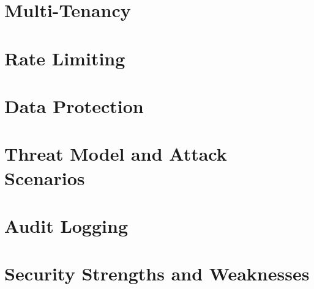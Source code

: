 \documentclass[a4paper,twoside]{sapthesis}
\begin{document}
\section{Multi-Tenancy}
\label{sec:multi-tenancy}

\section{Rate Limiting}
\label{sec:rate-limiting}

\section{Data Protection}
\label{sec:data-protection}

\section{Threat Model and Attack Scenarios}
\label{sec:threat-model}

\section{Audit Logging}
\label{sec:audit-logging}

\section{Security Strengths and Weaknesses}
\label{sec:security-strengths-weaknesses}


\end{document}
